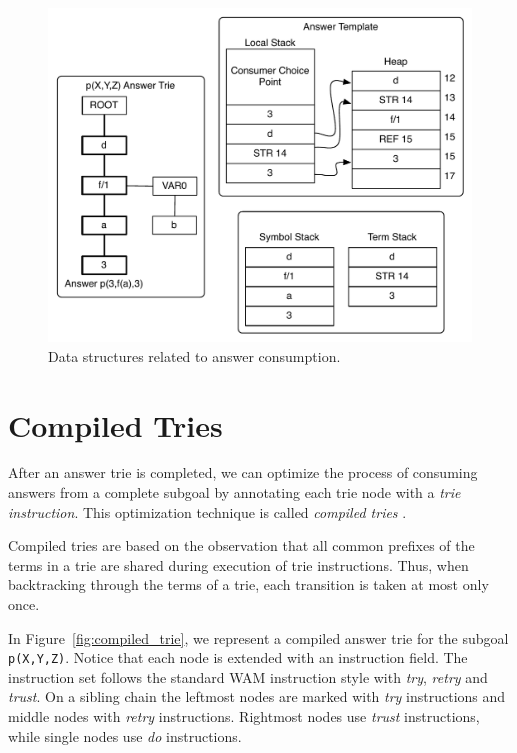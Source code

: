 \begin{figure}[h]
  \centering
    \includegraphics[scale=0.40]{consume_answer.pdf}
  \caption{Data structures related to answer consumption.}
  \label{fig:consume_answer}
\end{figure}

\section{Compiled Tries}\label{sec:compiled_tries}

After an answer trie is completed, we can optimize the process of consuming answers from a complete
subgoal by annotating each trie node with a \textit{trie instruction}. This optimization technique
is called \textit{compiled tries} \cite{RamakrishnanIV-99}.

Compiled tries are based on the observation that all common prefixes of the terms in a trie
are shared during execution of trie instructions. Thus, when backtracking
through the terms of a trie, each transition is taken at most only once.

In Figure~\ref{fig:compiled_trie}, we represent a compiled answer trie for the subgoal
\texttt{p(X,Y,Z)}. Notice that each node is extended with an instruction field.
The instruction set follows the standard WAM instruction style with \textit{try},
\textit{retry} and \textit{trust}. On a sibling chain the leftmost nodes are marked
with \textit{try} instructions and middle nodes with \textit{retry} instructions. Rightmost
nodes use \textit{trust} instructions, while single nodes use \textit{do} instructions.

